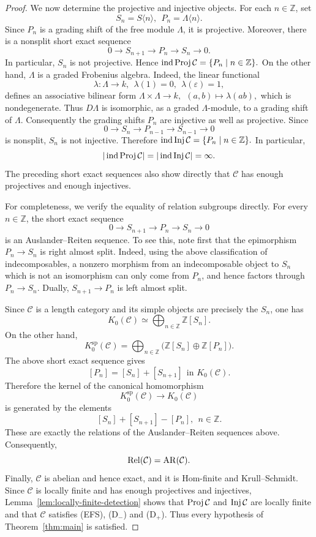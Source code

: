 \documentclass[11pt, twoside]{article}
\def\C{\mathcal{C}}
\numberwithin{equation}{section}
\begin{document}
\begin{proof}
We now determine the projective and injective objects.  For each
$n\in\mathbb Z$, set
\[
 S_n=S\langle n\rangle,
 ~~
 P_n=\Lambda\langle n\rangle.
\]
Since $P_n$ is a grading shift of the free module $\Lambda$, it is
projective.  Moreover, there is a nonsplit short exact sequence
\[
 0\longrightarrow S_{n+1}
 \longrightarrow P_n
 \longrightarrow S_n
 \longrightarrow0.
\]
In particular, $S_n$ is not projective.  Hence
$
 \ind\Proj\C=\{P_n\mid n\in\mathbb Z\}.
$
On the other hand, $\Lambda$ is a graded Frobenius algebra.  Indeed, the
linear functional
\[
 \lambda\colon\Lambda\longrightarrow k,
~~
 \lambda(1)=0,~~
 \lambda(\varepsilon)=1,
\]
defines an associative bilinear form
$
 \Lambda\times\Lambda\longrightarrow k,
~~
 (a,b)\longmapsto\lambda(ab),
$
which is nondegenerate.  Thus $D\Lambda$ is isomorphic, as a graded
$\Lambda$-module, to a grading shift of $\Lambda$.
Consequently the
grading shifts $P_n$ are injective as well as projective.  Since
\[
 0\longrightarrow S_n
 \longrightarrow P_{n-1}
 \longrightarrow S_{n-1}
 \longrightarrow0
\]
is nonsplit, $S_n$ is not injective.  Therefore
$
 \ind\Inj\C=\{P_n\mid n\in\mathbb Z\}.
$
In particular,
\[
 |\ind\Proj\C|
 =
 |\ind\Inj\C|
 =
 \infty.
\]
The preceding short exact sequences also show directly that $\C$ has
enough projectives and enough injectives.

For completeness, we verify the equality of relation subgroups directly.
For every $n\in\mathbb Z$, the short exact sequence
\[
 0\longrightarrow S_{n+1}
 \longrightarrow P_n
 \longrightarrow S_n
 \longrightarrow0
\]
is an Auslander--Reiten sequence.  To see this, note first that the
epimorphism $P_n\to S_n$ is right almost split.  Indeed, using the above
classification of indecomposables, a nonzero morphism from an
indecomposable object to $S_n$ which is not an isomorphism can only come
from $P_n$, and hence factors through $P_n\to S_n$.  Dually,
$S_{n+1}\to P_n$ is left almost split.

Since $\C$ is a length category and its simple objects are precisely the
$S_n$, one has
\[
 K_0(\C)\simeq
 \bigoplus_{n\in\mathbb Z}\mathbb Z[S_n].
\]
On the other hand,
\[
 K_0^{\mathrm{sp}}(\C)
 =
 \bigoplus_{n\in\mathbb Z}
 \bigl(\mathbb Z[S_n]\oplus\mathbb Z[P_n]\bigr).
\]
The above short exact sequence gives
\[
 [P_n]=[S_n]+[S_{n+1}]
 ~~\text{in }K_0(\C).
\]
Therefore the kernel of the canonical homomorphism
\[
 K_0^{\mathrm{sp}}(\C)\longrightarrow K_0(\C)
\]
is generated by the elements
\[
 [S_n]+[S_{n+1}]-[P_n],
~~n\in\mathbb Z.
\]
These are exactly the relations of the Auslander--Reiten sequences above.
Consequently,
\[
 \Rel(\C)=\AR(\C).
\]
Finally, $\C$ is abelian and hence exact, and it is Hom-finite and
Krull--Schmidt.  Since $\C$ is locally finite and has enough projectives
and injectives, Lemma~\ref{lem:locally-finite-detection} shows that
$\Proj\C$ and $\Inj\C$ are locally finite and that $\C$ satisfies
{(EFS)}, {(D$_-$)} and {(D$_+$)}.  Thus every hypothesis
of Theorem~\ref{thm:main} is satisfied.
\end{proof}
\end{document}
